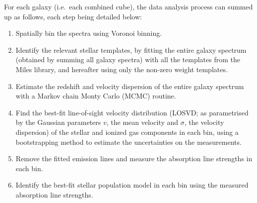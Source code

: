 	For each galaxy (i.e.\ each combined cube), the data analysis process can summed up as follows, each step being detailed below:
	\begin{enumerate}
		\item Spatially bin the spectra using Voronoi binning.
		\item Identify the relevant stellar templates, by fitting the entire galaxy spectrum (obtained by summing all galaxy spectra) with all the templates from the Miles library, and hereafter using only the non-zero weight templates.
		\item Estimate the redshift and velocity dispersion of the entire galaxy spectrum with a Markov chain Monty Carlo (MCMC) routine. 
		\item Find the best-fit line-of-sight velocity distribution (LOSVD; as parametrised by the Gaussian parameters $v$, the mean velocity and $\sigma$, the velocity dispersion) of the stellar and ionized gas components in each bin, using a bootstrapping method to estimate the uncertainties on the measurements. 
		\item Remove the fitted emission lines and measure the absorption line strengths in each bin. 
		\item Identify the best-fit stellar population model in each bin using the measured absorption line strengths.
	\end{enumerate}


